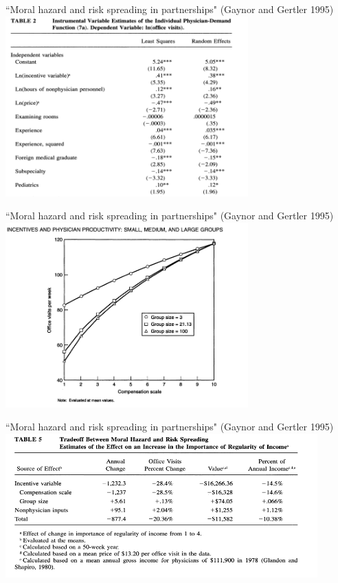\documentclass[aspectratio=169,usenames,dvipsnames]{beamer}
\begin{document}
\begin{frame}[c]{``Moral hazard and risk spreading in partnerships" (Gaynor and Gertler 1995)}
\centering
\includegraphics[width=0.7\textwidth]{pictures/demand_physicians.png}
\end{frame}

\begin{frame}[c]{``Moral hazard and risk spreading in partnerships" (Gaynor and Gertler 1995)}
\centering
\includegraphics[width=0.7\textwidth]{pictures/physicians_comp_demand.png}
\end{frame}
\begin{frame}{``Moral hazard and risk spreading in partnerships" (Gaynor and Gertler 1995)}
\centering
\includegraphics[width=0.9\textwidth]{pictures/physicians_riskspreading.png}
\end{frame}
\end{document}
